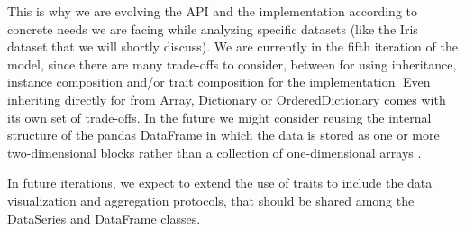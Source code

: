 \documentclass[sigplan]{acmart}
\begin{document}
This is why we are evolving the API and the implementation according to concrete needs we are facing while analyzing specific datasets (like the Iris dataset that we will shortly discuss). We are currently in the fifth iteration of the model, since there are many trade-offs to consider, between for \eg using inheritance, instance composition and/or trait composition for the implementation. Even inheriting directly for \eg from Array, Dictionary or OrderedDictionary comes with its own set of trade-offs. In the future we might consider reusing the internal structure of the pandas DataFrame in which the data is stored as one or more two-dimensional blocks rather than a collection of one-dimensional arrays \cite{McKinney}. 

In future iterations, we expect to extend the use of traits to include the data visualization and aggregation protocols, that should be shared among the DataSeries and DataFrame classes. 

%
\end{document}
